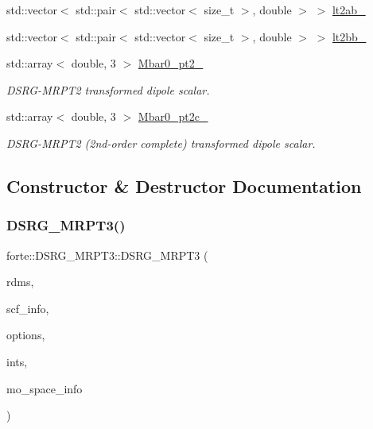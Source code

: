 \begin{DoxyCompactItemize}
\item 
std\+::vector$<$ std\+::pair$<$ std\+::vector$<$ size\+\_\+t $>$, double $>$ $>$ \mbox{\hyperlink{classforte_1_1_d_s_r_g___m_r_p_t3_a3a00248cfbd090f9c1338d534b9ae233}{lt2ab\+\_\+}}
\item 
std\+::vector$<$ std\+::pair$<$ std\+::vector$<$ size\+\_\+t $>$, double $>$ $>$ \mbox{\hyperlink{classforte_1_1_d_s_r_g___m_r_p_t3_a819e9535c0fa33f8918569629f6bf552}{lt2bb\+\_\+}}
\item 
std\+::array$<$ double, 3 $>$ \mbox{\hyperlink{classforte_1_1_d_s_r_g___m_r_p_t3_a0d739ecebfa2759f30e21e1fd46bf5d1}{Mbar0\+\_\+pt2\+\_\+}}
\begin{DoxyCompactList}\small\item\em D\+S\+R\+G-\/\+M\+R\+P\+T2 transformed dipole scalar. \end{DoxyCompactList}\item 
std\+::array$<$ double, 3 $>$ \mbox{\hyperlink{classforte_1_1_d_s_r_g___m_r_p_t3_ac79b938fc2c1551fed6195eaddad5616}{Mbar0\+\_\+pt2c\+\_\+}}
\begin{DoxyCompactList}\small\item\em D\+S\+R\+G-\/\+M\+R\+P\+T2 (2nd-\/order complete) transformed dipole scalar. \end{DoxyCompactList}\end{DoxyCompactItemize}


\subsection{Constructor \& Destructor Documentation}
\mbox{\label{classforte_1_1_d_s_r_g___m_r_p_t3_a411038a819da24f5ffb4db0cf621a742}} 
\subsubsection{\texorpdfstring{D\+S\+R\+G\+\_\+\+M\+R\+P\+T3()}{DSRG\_MRPT3()}}
{\footnotesize\ttfamily forte\+::\+D\+S\+R\+G\+\_\+\+M\+R\+P\+T3\+::\+D\+S\+R\+G\+\_\+\+M\+R\+P\+T3 (\begin{DoxyParamCaption}\item[{\mbox{\hyperlink{classforte_1_1_r_d_ms}{R\+D\+Ms}}}]{rdms,  }\item[{std\+::shared\+\_\+ptr$<$ \mbox{\hyperlink{classforte_1_1_s_c_f_info}{S\+C\+F\+Info}} $>$}]{scf\+\_\+info,  }\item[{std\+::shared\+\_\+ptr$<$ \mbox{\hyperlink{classforte_1_1_forte_options}{Forte\+Options}} $>$}]{options,  }\item[{std\+::shared\+\_\+ptr$<$ \mbox{\hyperlink{classforte_1_1_forte_integrals}{Forte\+Integrals}} $>$}]{ints,  }\item[{std\+::shared\+\_\+ptr$<$ \mbox{\hyperlink{classforte_1_1_m_o_space_info}{M\+O\+Space\+Info}} $>$}]{mo\+\_\+space\+\_\+info }\end{DoxyParamCaption})}

